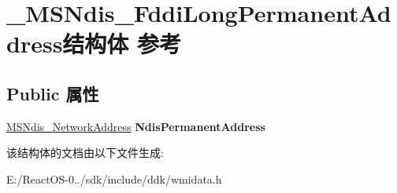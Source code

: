 \hypertarget{struct___m_s_ndis___fddi_long_permanent_address}{}\section{\+\_\+\+M\+S\+Ndis\+\_\+\+Fddi\+Long\+Permanent\+Address结构体 参考}
\label{struct___m_s_ndis___fddi_long_permanent_address}
\subsection*{Public 属性}
\begin{DoxyCompactItemize}
\item 
\mbox{\label{struct___m_s_ndis___fddi_long_permanent_address_aebf2b8fee11fc1bf00d95df8ea284017}} 
\hyperlink{struct___m_s_ndis___network_address}{M\+S\+Ndis\+\_\+\+Network\+Address} {\bfseries Ndis\+Permanent\+Address}
\end{DoxyCompactItemize}


该结构体的文档由以下文件生成\+:\begin{DoxyCompactItemize}
\item 
E\+:/\+React\+O\+S-\/0../sdk/include/ddk/wmidata.\+h\end{DoxyCompactItemize}
